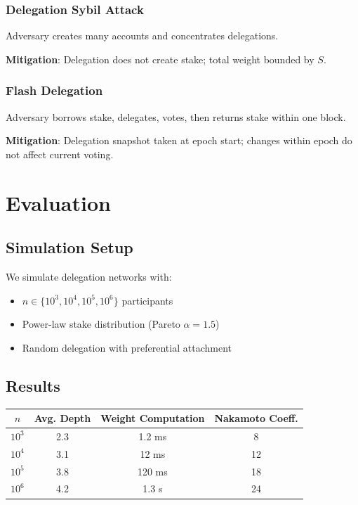 \documentclass[11pt,a4paper]{article}
\begin{document}
\subsubsection{Delegation Sybil Attack}
Adversary creates many accounts and concentrates delegations.

\textbf{Mitigation}: Delegation does not create stake; total weight bounded by $S$.

\subsubsection{Flash Delegation}
Adversary borrows stake, delegates, votes, then returns stake within one block.

\textbf{Mitigation}: Delegation snapshot taken at epoch start; changes within epoch do not affect current voting.

\section{Evaluation}

\subsection{Simulation Setup}

We simulate delegation networks with:
\begin{itemize}
    \item $n \in \{10^3, 10^4, 10^5, 10^6\}$ participants
    \item Power-law stake distribution (Pareto $\alpha = 1.5$)
    \item Random delegation with preferential attachment
\end{itemize}

\subsection{Results}

\begin{center}
\begin{tabular}{|c|c|c|c|}
\hline
$n$ & Avg. Depth & Weight Computation & Nakamoto Coeff. \\
\hline
$10^3$ & 2.3 & 1.2 ms & 8 \\
$10^4$ & 3.1 & 12 ms & 12 \\
$10^5$ & 3.8 & 120 ms & 18 \\
$10^6$ & 4.2 & 1.3 s & 24 \\
\hline
\end{tabular}
\end{center}
\end{document}
